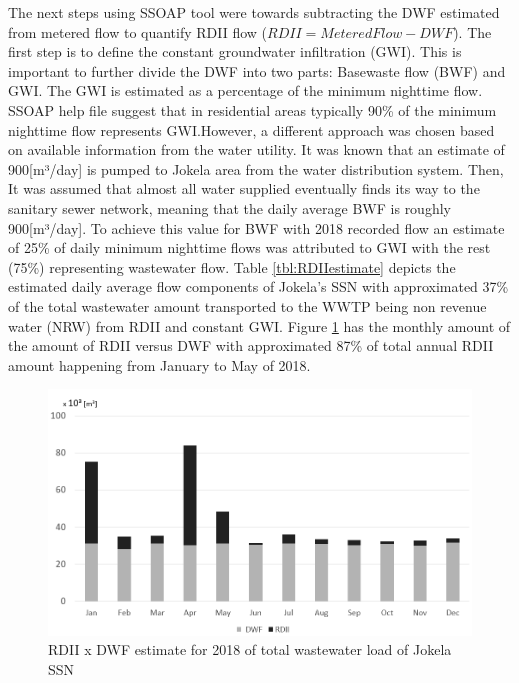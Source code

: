 The next steps using SSOAP tool were towards subtracting the DWF estimated from metered flow to quantify RDII flow ($RDII = Metered Flow - DWF$). The first step is to define the constant groundwater infiltration (GWI). This is important to further divide the DWF into two parts: Basewaste flow (BWF) and GWI. The GWI is estimated as a percentage of the minimum nighttime flow. SSOAP help file suggest that in residential areas typically 90\% of the minimum nighttime flow represents GWI.However, a different approach was chosen based on available information from the water utility. It was known that an estimate of 900[m³/day] is pumped to Jokela area from the water distribution system. Then, It was assumed that almost all water supplied eventually finds its way to the sanitary sewer network, meaning that the daily average BWF is roughly 900[m³/day]. To achieve this value for BWF with 2018 recorded flow an estimate of 25\% of daily minimum nighttime flows was attributed to GWI with the rest (75\%) representing wastewater flow. Table \ref{tbl:RDIIestimate} depicts the estimated daily average flow components of Jokela's \ac{SSN} with approximated 37\% of the total wastewater amount transported to the \ac{WWTP} being non revenue water (NRW) from RDII and constant GWI. Figure \ref{fig:rdiixdwf} has the monthly amount of the amount of RDII versus DWF with approximated 87\% of total annual RDII amount happening from January to May of 2018.

\begin{figure}[h]
    \centering
	\includegraphics[scale=0.75]{figures/rdii_x_dwf_2018.png}
	\caption{RDII x DWF estimate for 2018 of total wastewater load of Jokela \ac{SSN}}
	\label{fig:rdiixdwf}
\end{figure}


